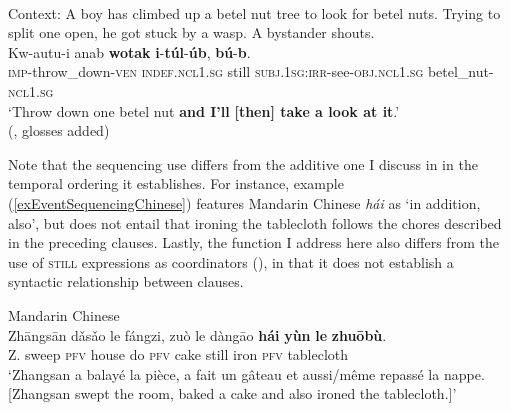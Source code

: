 \begin{exe}
	\ex {}\label{exEventSequencingBukiyipIntro}\\
	Context: A boy has climbed up a betel nut tree to look for betel nuts. Trying to split one open, he got stuck by a wasp. A bystander shouts.\\
	\gll Kw-autu-i anab \textbf{wotak} \textbf{i}-\textbf{túl}-\textbf{úb}, \textbf{bú}-\textbf{b}.\\
	\textsc{imp}-throw\_down-\textsc{ven} \textsc{indef}.\textsc{ncl}1.\textsc{sg} still \textsc{subj}.1\textsc{sg}:\textsc{irr}-see-\textsc{obj}.\textsc{ncl}1.\textsc{sg} betel\_nut-\textsc{ncl}1.\textsc{sg}\\
	\glt \lq Throw down one betel nut \textbf{and I’ll} \textbf{[then] take a look at it}.'
	\\(\cite[233]{ConradWigoga1991}, glosses added)
\end{exe}

Note that the sequencing use differs from the additive one I discuss in  in the temporal ordering it establishes. For instance, example (\ref{exEventSequencingChinese}) features Mandarin Chinese \textit{hái} as \lq in addition, also\rq{}, but does not entail that ironing the tablecloth follows the chores described in the preceding clauses. Lastly, the function I address here also differs from the use of  \textsc{still} expressions as coordinators (), in that it does not establish a syntactic relationship between clauses.\largerpage[2.25]

\begin{exe}
	\ex Mandarin Chinese\label{exEventSequencingChinese}\\
		\gll Zhāngsān dǎsǎo le fángzi, zuò le dàngāo \textbf{hái} \textbf{yùn} \textbf{le} \textbf{zhuōbù}.\\
	Z. sweep \textsc{pfv} house do \textsc{pfv} cake still iron \textsc{pfv} tablecloth\\
	\glt \lq Zhangsan a balayé la pièce, a fait un gâteau et aussi/même repassé la nappe. [Zhangsan swept the room, baked a cake and also ironed the tablecloth.]\rq{ }\parencite[113]{Donazzan2008}
\end{exe}

